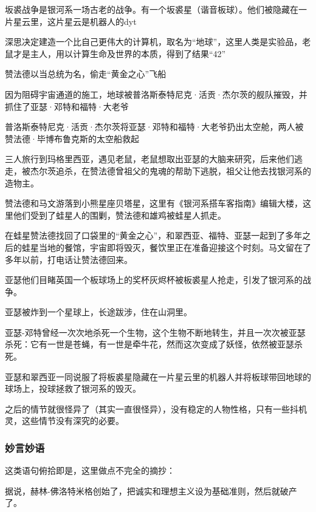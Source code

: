 \begin{itemize*}

	\item 坂裘战争是银河系一场古老的战争。有一个坂裘星（谐音板球）。他们被隐藏在一片星云里，这片星云是机器人的dyt
	\item 深思决定建造一个比自己更伟大的计算机，取名为“地球”，这里人类是实验品，老鼠才是主人，用以计算生命及世界的本质，得到了结果“42”
	\item 赞法德以当总统为名，偷走“黄金之心”飞船
	\item 因为阻碍宇宙通道的施工，地球被普洛斯泰特尼克·活贡·杰尔茨的舰队摧毁，并抓住了亚瑟·邓特和福特·大老爷
	\item 普洛斯泰特尼克·活贡·杰尔茨将亚瑟·邓特和福特·大老爷扔出太空舱，两人被赞法德·毕博布鲁克斯的太空船救起
	\item 三人旅行到玛格里西亚，遇见老鼠，老鼠想取出亚瑟的大脑来研究，后来他们逃走，被杰尔茨追杀，在赞法德曾祖父的鬼魂的帮助下逃脱，祖父让他去找银河系的造物主。
	\item 赞法德和马文游落到小熊星座贝塔星，这里有《银河系搭车客指南》编辑大楼，这里他们受到了蛙星人的围剿，赞法德和雄鸡被蛙星人抓走。
	\item 在蛙星赞法德找回了口袋里的“黄金之心”，和翠西亚、福特、亚瑟一起到了多年之后的蛙星当地的餐馆，宇宙即将毁灭，餐饮里正在准备迎接这个时刻。马文留在了多年以前，打电话让赞法德回来。
	\item 亚瑟他们目睹英国一个板球场上的奖杯灰烬杯被板裘星人抢走，引发了银河系的战争。
	\item 亚瑟被炸到一个星球上，长途跋涉，住在山洞里。
	\item 亚瑟-邓特曾经一次次地杀死一个生物，这个生物不断地转生，并且一次次被亚瑟杀死：它有一世是苍蝇，有一世是牵牛花，然而这次变成了妖怪，依然被亚瑟杀死。
	\item 亚瑟和翠西亚一同说服了将板裘星隐藏在一片星云里的机器人并将板球带回地球的球场上，投球拯救了银河系的毁灭。
\end{itemize*}

之后的情节就很怪异了（其实一直很怪异），没有稳定的人物性格，只有一些抖机灵，这些情节没有深究的必要。

\subsubsection{妙言妙语}
这类语句俯拾即是，这里做点不完全的摘抄：
\begin{itemize*}
	\item 据说，赫林-佛洛特米格创始了，把诚实和理想主义设为基础准则，然后就破产了。
\end{itemize*}

